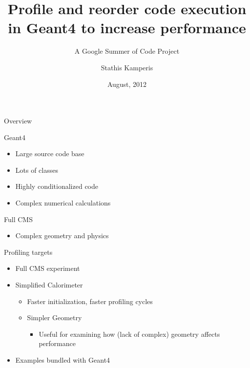 \documentclass{beamer}
\begin{document}
\title{Profile and reorder code execution in Geant4 to increase performance}
\subtitle{A Google Summer of Code Project}
\author{Stathis Kamperis}
\date{August, 2012}

\begin{frame}[plain]
  \titlepage
\end{frame}


\begin{frame}{Overview}

Geant4
\begin{itemize}
  \item Large source code base
  \item Lots of classes
  \item Highly conditionalized code
  \item Complex numerical calculations
\end{itemize}

Full CMS
\begin{itemize}
\item Complex geometry and physics
\end{itemize}

\begin{center}
\end{center}
\end{frame}

\begin{frame}{Profiling targets}
\begin{itemize}
\item Full CMS experiment
\item Simplified Calorimeter
\begin{itemize}
\item Faster initialization, faster profiling cycles
\item Simpler Geometry
\begin{itemize}
\item Useful for examining how (lack of complex) geometry affects performance
\end{itemize}
\end{itemize}
\item Examples bundled with Geant4
\end{itemize}
\end{frame}
\end{document}
